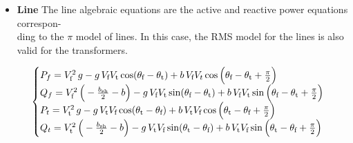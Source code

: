 \begin{itemize}

\item \textbf{Line}
The line algebraic equations are the active and reactive power equations correspon-\\ding to the $\pi$ model of lines.
In this case, the RMS model for the lines is also valid for the transformers.

\begin{equation}
\begin{cases}
P_f = V_{\text{f}}^2 \, g - g \, V_{\text{f}} V_{\text{t}} \cos(\theta_{\text{f}} - \theta_{\text{t}}) + b \, V_{\text{f}} V_{t} \cos\Big(\theta_{\text{f}} - \theta_{\text{t}} + \frac{\pi}{2}\Big) \\
Q_f = V_{\text{f}}^2 \, \Big(-\frac{b_{\text{sh}}}{2} - b \Big) - g \, V_{\text{f}} V_{\text{t}} \sin(\theta_{\text{f}} - \theta_{\text{t}}) + b \, V_{\text{f}} V_{\text{t}} \sin\Big(\theta_{\text{f}} - \theta_{\text{t}} + \frac{\pi}{2}\Big) \\
P_t = V_{\text{t}}^2 \, g - g \, V_{\text{t}} V_{\text{f}} \cos(\theta_{\text{t}} - \theta_{\text{f}}) + b \, V_{\text{t}} V_{\text{f}} \cos\Big(\theta_{\text{t}} - \theta_{\text{f}} + \frac{\pi}{2}\Big) \\
Q_t = V_{\text{\text{t}}}^2 \, \Big(-\frac{b_{\text{sh}}}{2} - b \Big) - g \, V_{\text{t}} V_{\text{f}} \sin(\theta_{\text{t}} - \theta_{\text{f}}) + b \, V_{\text{t}} V_{\text{f}} \sin\Big(\theta_{\text{t}} - \theta_{\text{f}} + \frac{\pi}{2}\Big)
\end{cases}
\label{eq:alg_eq_line}
\end{equation}


\end{itemize}
